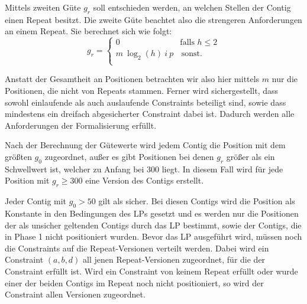 
Mittels zweiten Güte $g_r$ soll entschieden werden, an welchen Stellen der Contig einen Repeat besitzt. Die zweite Güte beachtet also die strengeren Anforderungen an einem Repeat. 
Sie berechnet sich wie folgt:
\[ g_r = \left\{
\begin{array}{ll}
0 & \textrm{falls } h \leq 2 \\
m\ \log_2(h) \ i \  p & \, \textrm{sonst.} \\
\end{array}
\right. \]

Anstatt der Gesamtheit an Positionen betrachten wir also hier mittels $m$ nur die Positionen, die nicht von Repeats stammen.
Ferner wird sichergestellt, dass sowohl einlaufende als auch auslaufende Constraints beteiligt sind, sowie dass mindestens ein dreifach abgesicherter Constraint dabei ist. 
Dadurch werden alle Anforderungen der Formalisierung erfüllt.

Nach der Berechnung der Gütewerte wird jedem Contig die Position mit dem größten $g_0$ zugeordnet, außer es gibt Positionen bei denen $g_r$ größer als ein Schwellwert ist, welcher zu Anfang bei 300 liegt. In diesem Fall wird für jede Position mit $g_r \geq 300$ eine Version des Contigs erstellt.

Jeder Contig mit $g_0 > 50$ gilt als sicher. Bei diesen Contigs wird die Position als Konstante in den Bedingungen des LPs gesetzt und es werden nur die Positionen der als unsicher geltenden Contigs durch das LP bestimmt, sowie der Contigs, die in Phase 1 nicht positioniert wurden. Bevor das LP ausgeführt wird, müssen noch die Constraints auf die Repeat-Versionen verteilt werden. 
Dabei wird ein Constraint $(a,b,d)$ all jenen Repeat-Versionen zugeordnet, für die der Constraint erfüllt ist. Wird ein Constraint von keinem Repeat erfüllt oder wurde einer der beiden Contigs im Repeat noch nicht positioniert, so wird der Constraint allen Versionen zugeordnet.

